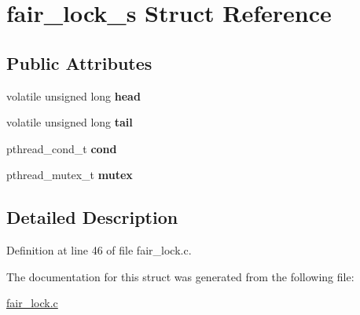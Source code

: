 \hypertarget{structfair__lock__s}{}\section{fair\+\_\+lock\+\_\+s Struct Reference}
\label{structfair__lock__s}
\subsection*{Public Attributes}
\begin{DoxyCompactItemize}
\item 
volatile unsigned long {\bfseries head}\hypertarget{structfair__lock__s_a82ae72fddf3b82e89df09ba676666a1d}{}\label{structfair__lock__s_a82ae72fddf3b82e89df09ba676666a1d}

\item 
volatile unsigned long {\bfseries tail}\hypertarget{structfair__lock__s_ac93da735bc27df26838d2da1449b82a0}{}\label{structfair__lock__s_ac93da735bc27df26838d2da1449b82a0}

\item 
pthread\+\_\+cond\+\_\+t {\bfseries cond}\hypertarget{structfair__lock__s_a4579f2490567b448ed315a2e53e3249d}{}\label{structfair__lock__s_a4579f2490567b448ed315a2e53e3249d}

\item 
pthread\+\_\+mutex\+\_\+t {\bfseries mutex}\hypertarget{structfair__lock__s_aca06b0cce8f020c4ca493f158377f06e}{}\label{structfair__lock__s_aca06b0cce8f020c4ca493f158377f06e}

\end{DoxyCompactItemize}


\subsection{Detailed Description}


Definition at line 46 of file fair\+\_\+lock.\+c.



The documentation for this struct was generated from the following file\+:\begin{DoxyCompactItemize}
\item 
\hyperlink{fair__lock_8c}{fair\+\_\+lock.\+c}\end{DoxyCompactItemize}
